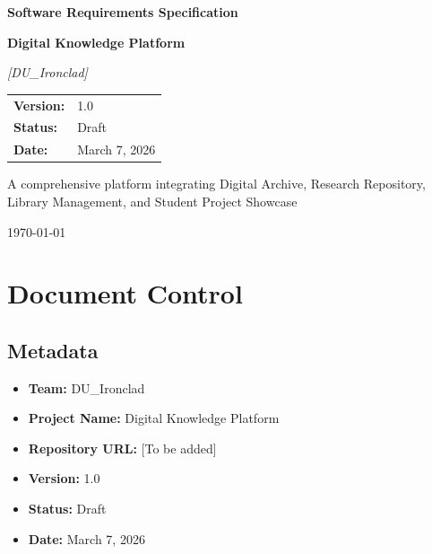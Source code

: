 \documentclass[12pt,a4paper]{report}
\begin{document}
\begin{titlepage}
    \centering
    \vspace*{2cm}
    
    {\Huge\bfseries Software Requirements Specification\par}
    \vspace{0.5cm}
    {\LARGE\bfseries Digital Knowledge Platform\par}
    \vspace{2cm}
    
    {\Large\itshape [DU\_Ironclad]\par}
    \vspace{1cm}
    
    \begin{tabular}{ll}
        \textbf{Version:} & 1.0 \\
        \textbf{Status:} & Draft \\
        \textbf{Date:} & March 7, 2026 \\
    \end{tabular}
    
    \vfill
    
    {\large A comprehensive platform integrating Digital Archive, Research Repository, Library Management, and Student Project Showcase\par}
    
    \vfill
    
    {\large \today\par}
\end{titlepage}

\tableofcontents
\newpage

\chapter{Document Control}

\section{Metadata}
\begin{itemize}
    \item \textbf{Team:} DU\_Ironclad
    \item \textbf{Project Name:} Digital Knowledge Platform
    \item \textbf{Repository URL:} [To be added]
    \item \textbf{Version:} 1.0
    \item \textbf{Status:} Draft
    \item \textbf{Date:} March 7, 2026
\end{itemize}
\end{document}
